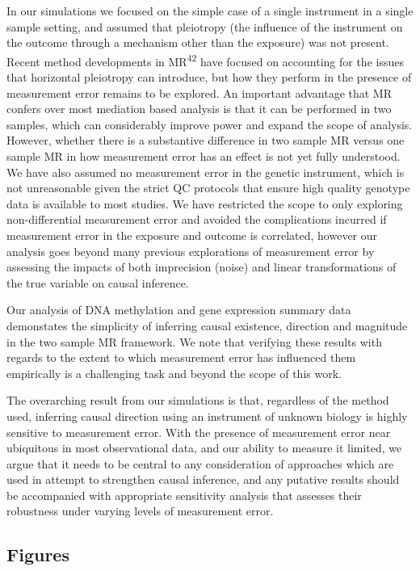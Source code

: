 \documentclass[]{article}
\begin{document}
In our simulations we focused on the simple case of a single instrument
in a single sample setting, and assumed that pleiotropy (the influence
of the instrument on the outcome through a mechanism other than the
exposure) was not present. Recent method developments in
MR\textsuperscript{42} have focused on accounting for the issues that
horizontal pleiotropy can introduce, but how they perform in the
presence of measurement error remains to be explored. An important
advantage that MR confers over most mediation based analysis is that it
can be performed in two samples, which can considerably improve power
and expand the scope of analysis. However, whether there is a
substantive difference in two sample MR versus one sample MR in how
measurement error has an effect is not yet fully understood. We have
also assumed no measurement error in the genetic instrument, which is
not unreasonable given the strict QC protocols that ensure high quality
genotype data is available to most studies. We have restricted the scope
to only exploring non-differential measurement error and avoided the
complications incurred if measurement error in the exposure and outcome
is correlated, however our analysis goes beyond many previous
explorations of measurement error by assessing the impacts of both
imprecision (noise) and linear transformations of the true variable on
causal inference.

Our analysis of DNA methylation and gene expression summary data
demonstates the simplicity of inferring causal existence, direction and
magnitude in the two sample MR framework. We note that verifying these
results with regards to the extent to which measurement error has
influenced them empirically is a challenging task and beyond the scope
of this work.

The overarching result from our simulations is that, regardless of the
method used, inferring causal direction using an instrument of unknown
biology is highly sensitive to measurement error. With the presence of
measurement error near ubiquitous in most observational data, and our
ability to measure it limited, we argue that it needs to be central to
any consideration of approaches which are used in attempt to strengthen
causal inference, and any putative results should be accompanied with
appropriate sensitivity analysis that assesses their robustness under
varying levels of measurement error.

\newpage

\subsection{Figures}\label{figures}
\end{document}
